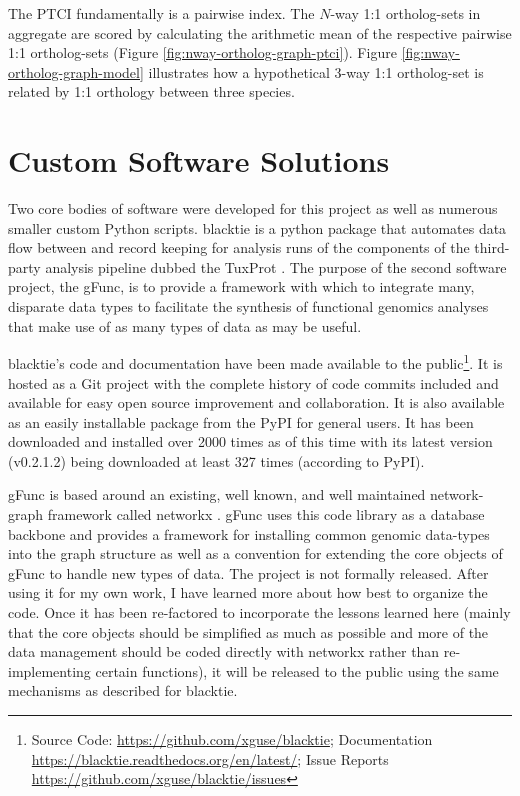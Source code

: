 

The \gls{PTCI} fundamentally is a pairwise index.
The $N$-way 1:1 ortholog-sets in aggregate are scored by calculating the arithmetic mean of the respective pairwise 1:1 ortholog-sets (Figure \ref{fig:nway-ortholog-graph-ptci}).
Figure \ref{fig:nway-ortholog-graph-model} illustrates how a hypothetical 3-way 1:1 ortholog-set is related by 1:1 orthology between three species.






\section{Custom Software Solutions}\label{sec:custom-software}

Two core bodies of software were developed for this project as well as numerous smaller custom Python scripts.
\gls{blacktie} is a python package that automates data flow between and record keeping for analysis runs of the components of the third-party analysis pipeline dubbed the \gls{TuxProt} \cite{Trapnell2012}.
The purpose of the second software project, the \gls{gFunc}, is to provide a framework with which to integrate many, disparate data types to facilitate the synthesis of functional genomics analyses that make use of as many types of data as may be useful.

\gls{blacktie}'s code and documentation have been made available to the public\footnote{Source Code: \url{https://github.com/xguse/blacktie}; Documentation \url{https://blacktie.readthedocs.org/en/latest/}; Issue Reports \url{https://github.com/xguse/blacktie/issues}}.
It is hosted as a \gls{Git} project with the complete history of code commits included and available for easy open source improvement and collaboration.
It is also available as an easily installable package from the \gls{PyPI} for general users.
It has been downloaded and installed over 2000 times as of this time with its latest version (v0.2.1.2) being downloaded at least 327 times (according to \gls{PyPI}).

\gls{gFunc} is based around an existing, well known, and well maintained network-graph framework called networkx \cite{Hagberg2008}.
\gls{gFunc} uses this code library as a database backbone and provides a framework for installing common genomic data-types into the graph structure as well as a convention for extending the core objects of \gls{gFunc} to handle new types of data.
The project is not formally released.
After using it for my own work, I have learned more about how best to organize the code.
Once it has been re-factored to incorporate the lessons learned here (mainly that the core objects should be simplified as much as possible and more of the data management should be coded directly with networkx rather than re-implementing certain functions), it will be released to the public using the same mechanisms as described for \gls{blacktie}.


